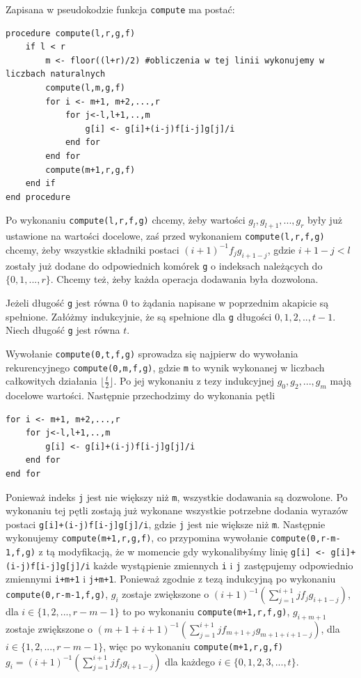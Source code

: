 \documentclass{article}
\begin{document}
Zapisana w pseudokodzie funkcja \texttt{compute} ma postać:

\begin{verbatim}
procedure compute(l,r,g,f)
    if l < r
        m <- floor((l+r)/2) #obliczenia w tej linii wykonujemy w liczbach naturalnych
        compute(l,m,g,f)
        for i <- m+1, m+2,...,r
            for j<-l,l+1,..,m
                g[i] <- g[i]+(i-j)f[i-j]g[j]/i
            end for
        end for
        compute(m+1,r,g,f)
    end if
end procedure
\end{verbatim}

Po wykonaniu \texttt{compute(l,r,f,g)} chcemy, żeby wartości $g_l,g_{l+1},...,g_{r}$ były już ustawione na wartości docelowe, zaś
przed wykonaniem \texttt{compute(l,r,f,g)} chcemy, żeby wszystkie składniki postaci $(i+1)^{-1}f_jg_{i+1-j}$, gdzie $i+1-j<l$ zostały
już dodane do odpowiednich komórek \texttt{g} o indeksach należących do $\{0,1,...,r\}$. Chcemy też, żeby każda operacja dodawania
była dozwolona. 

Jeżeli długość \texttt{g} jest równa $0$ to żądania napisane w poprzednim akapicie są spełnione. 
Załóżmy indukcyjnie, że są spełnione dla \texttt{g} długości $0,1,2,..,t-1$. Niech długość \texttt{g} jest równa $t$.

Wywołanie \texttt{compute(0,t,f,g)} sprowadza się najpierw do wywołania rekurencyjnego \texttt{compute(0,m,f,g)}, gdzie \texttt{m} to wynik wykonanej w
liczbach całkowitych działania $\lfloor \frac{t}{2}\rfloor$. Po jej wykonaniu z tezy indukcyjnej $g_0,g_2,...,g_m$ mają docelowe
wartości. Następnie przechodzimy do wykonania pętli
\begin{verbatim}
for i <- m+1, m+2,...,r
    for j<-l,l+1,..,m
        g[i] <- g[i]+(i-j)f[i-j]g[j]/i
    end for
end for
\end{verbatim}

Ponieważ indeks \texttt{j} jest nie większy niż \texttt{m}, wszystkie dodawania są dozwolone. 
Po wykonaniu tej pętli zostają już wykonane wszystkie
potrzebne dodania wyrazów postaci \texttt{g[i]+(i-j)f[i-j]g[j]/i}, gdzie \texttt{j} jest nie większe niż \texttt{m}. 
Następnie wykonujemy \texttt{compute(m+1,r,g,f)}, co przypomina wywołanie \texttt{compute(0,r-m-1,f,g)} z tą modyfikacją, że w momencie 
gdy wykonalibyśmy linię \texttt{g[i] <- g[i]+(i-j)f[i-j]g[j]/i} każde wystąpienie
zmiennych \texttt{i} i \texttt{j} zastępujemy odpowiednio zmiennymi \texttt{i+m+1} i \texttt{j+m+1}. Ponieważ zgodnie z tezą
indukcyjną po wykonaniu \texttt{compute(0,r-m-1,f,g)},
$g_i$ zostaje zwiększone o $(i+1)^{-1}(\sum_{j=1}^{i+1}jf_jg_{i+1-j})$, dla $i \in \{1,2,...,r-m-1\}$ 
to po wykonaniu \texttt{compute(m+1,r,f,g)}, $g_{i+m+1}$  zostaje zwiększone o $(m+1+i+1)^{-1}(\sum_{j=1}^{i+1}jf_{m+1+j}g_{m+1+i+1-j})$, 
dla $i \in \{1,2,...,r-m-1\}$, więc po wykonaniu \texttt{compute(m+1,r,g,f)} $g_i=(i+1)^{-1}(\sum_{j=1}^{i+1}jf_jg_{i+1-j})$ dla każdego
$i \in \{0,1,2,3,...,t\}$. 
\end{document}
